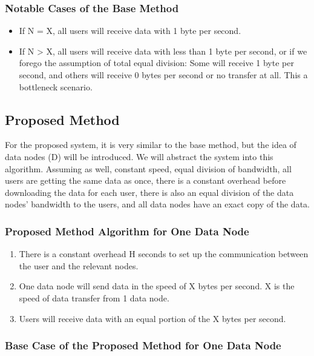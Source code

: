 \documentclass[acmsmall]{acmart}
\begin{document}
\subsubsection{Notable Cases of the Base Method}
    \begin{itemize} 
        \item If N = X, all users will receive data with 1 byte per second.
        \item If N > X, all users will receive data with less than 1 byte per second, or if we forego the assumption of total equal division: Some will receive 1 byte per second, and others will receive 0 bytes per second or no transfer at all. This a bottleneck scenario.
    \end{itemize}

\subsection{Proposed Method}
For the proposed system, it is very similar to the base method, but the idea of data nodes (D) will be introduced. We will abstract the system into this algorithm. Assuming as well, constant speed, equal division of bandwidth, all users are getting the same data as once, there is a constant overhead before downloading the data for each user, there is also an equal division of the data nodes' bandwidth to the users, and all data nodes have an exact copy of the data.

\subsubsection{Proposed Method Algorithm for One Data Node}

\begin{enumerate}
    \item There is a constant overhead H seconds to set up the communication between the user and the relevant nodes.
    \item One data node will send data in the speed of X bytes per second. X is the speed of data transfer from 1 data node.
    \item Users will receive data with an equal portion of the X bytes per second. 
\end{enumerate}

\subsubsection{Base Case of the Proposed Method for One Data Node}
\end{document}
